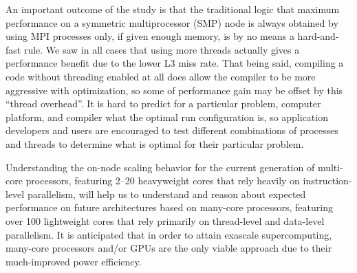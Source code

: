 \documentclass{mc2015}
\begin{document}
An important outcome of the study is that the traditional logic that maximum
performance on a symmetric multiprocessor (SMP) node is always obtained by using
MPI processes only, if given enough memory, is by no means a hard-and-fast
rule. We saw in all cases that using more threads actually gives a performance
benefit due to the lower L3 miss rate. That being said, compiling a code without
threading enabled at all does allow the compiler to be more aggressive with
optimization, so some of performance gain may be offset by this ``thread
overhead''. It is hard to predict for a particular problem, computer platform,
and compiler what the optimal run configuration is, so application developers
and users are encouraged to test different combinations of processes and threads
to determine what is optimal for their particular problem.

Understanding the on-node scaling behavior for the current generation of
multi-core processors, featuring 2--20 heavyweight cores that rely heavily on
instruction-level parallelism, will help us to understand and reason about
expected performance on future architectures based on many-core processors,
featuring over 100 lightweight cores that rely primarily on thread-level and
data-level parallelism. It is anticipated that in order to attain exascale
supercomputing, many-core processors and/or GPUs are the only viable approach
due to their much-improved power efficiency.


\setlength{\baselineskip}{12pt}



\end{document}
